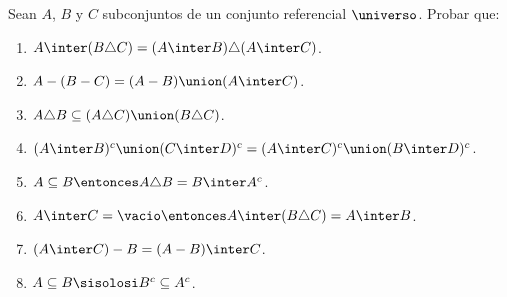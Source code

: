 \begin{enunciado}{\ejercicio}

  Sean $A$, $B$ y $C$ subconjuntos de un conjunto referencial $\universo$. Probar que:
  \begin{multicols}{2}
    \begin{enumerate}[label=\roman*)]
      \item $A \inter (B \triangle C) = (A \inter B) \triangle (A \inter C)$.
      \item $A - (B - C) = (A-B) \union (A \inter C)$.
      \item $A \triangle B \subseteq (A \triangle C) \union (B \triangle C)$.
      \item $(A \inter B)^c \union (C \inter D)^c = (A \inter C)^c \union (B \inter D)^c$.
      \item $A \subseteq B \entonces A \triangle B = B \inter A^c$.
      \item $A \inter C = \vacio \entonces A \inter (B \triangle C) = A \inter B$.
      \item $(A \inter C ) - B = (A - B) \inter C$.
      \item $A \subseteq B \sisolosi B^c \subseteq A^c$.
    \end{enumerate}
  \end{multicols}

\end{enunciado}

